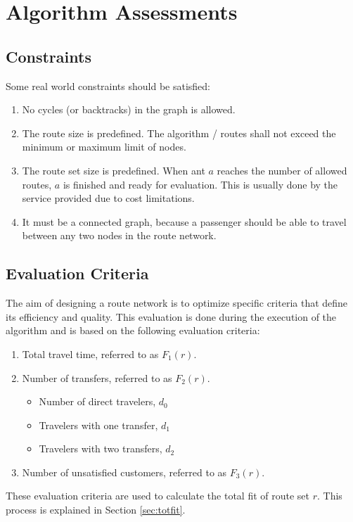 \section{Algorithm Assessments}

\subsection{Constraints}
\label{sec:algoConstraints}
Some real world constraints should be satisfied:
\begin{enumerate}
\item \label{itm:constraintCycles} No cycles (or backtracks) in the graph is allowed.
\item \label{itm:constraintRouteSize} The route size is predefined. The algorithm / routes shall not exceed the minimum or maximum limit of nodes.
\item \label{itm:constraintRouteSetSize} The route set size is predefined. When ant $a$ reaches the number of allowed routes, $a$ is finished and ready for evaluation. This is usually done by the service provided due to cost limitations.
\item \label{itm:criteriaConnectedGraph} It must be a connected graph, because a passenger should be able to travel between any two nodes in the route network.
\end{enumerate}

\subsection{Evaluation Criteria} 
The aim of designing a route network is to optimize specific criteria that define its efficiency and quality. This evaluation is done during the execution of the algorithm and is based on the following evaluation criteria:
\begin{enumerate}
\item \label{itm:criteriaTotalTravelTime} Total travel time, referred to as $F_1(r)$.
\item \label{itm:f2} Number of transfers, referred to as $F_2(r)$.
\begin{itemize}
\item Number of direct travelers, $d_0$
\item Travelers with one transfer, $d_1$
\item Travelers with two transfers, $d_2$
\end{itemize}
\item Number of unsatisfied customers, referred to as $F_3(r)$. 
\end{enumerate}
These evaluation criteria are used to calculate the total fit of route set $r$. This process is explained in Section \vref{sec:totfit}.



